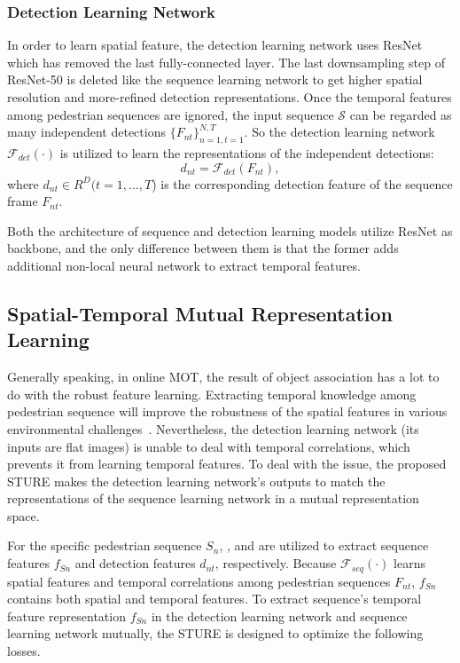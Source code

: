 \documentclass[times,twocolumn,final,authoryear]{elsarticle}
\begin{document}
\subsubsection{Detection Learning Network}
\label{sec:imagemodel}

In order to learn spatial feature, the detection learning network uses ResNet which has removed the last fully-connected layer.
The last downsampling step of ResNet-50 is deleted like the sequence learning network to get higher spatial resolution and more-refined detection representations.
Once the temporal features among pedestrian sequences are ignored, the input sequence $\mathcal{S}$ can be regarded as many independent detections $\{F_{nt}\}_{n=1,t=1}^{N,T}$.
So the detection learning network $\mathcal{F}_{det}(\cdot)$ is utilized to learn the representations of the independent detections: 
\begin{equation}\label{eq:detection_network}
d_{nt}=\mathcal{F}_{det}(F_{nt}),
\end{equation}
where $d_{nt}\in R^{D} (t=1,...,T$) is the corresponding detection feature of the sequence frame $F_{nt}$.

Both the architecture of sequence and detection learning models utilize ResNet as backbone,
and the only difference between them is that the former adds additional non-local neural network to extract temporal features.



\subsection{Spatial-Temporal Mutual {Representation} Learning}
\label{sec:stml}
Generally speaking, in online MOT, the result of object association has a lot to do with the robust feature learning.
Extracting temporal knowledge among pedestrian sequence {will improve} the robustness of the spatial features in various environmental challenges~\citep{RN986}.
Nevertheless, the detection learning network (its inputs are flat images) is unable to deal with temporal correlations, which {prevents} it from learning temporal features.
To deal with the issue, the proposed STURE makes the detection learning network's outputs to match the representations of the sequence learning network in a mutual representation space.

For the specific pedestrian sequence $S_n$, ,  and  are utilized to extract sequence features $f_{Sn}$ and detection features $d_{nt}${, respectively}.
Because $\mathcal{F}_{seq}(\cdot)$ learns spatial features and temporal correlations among pedestrian sequences $F_{nt}$, $f_{Sn}$ contains both spatial and temporal features.
To extract sequence's temporal feature representation $f_{Sn}$ in the detection learning network and sequence learning network mutually, the STURE is designed to optimize the following losses.
\end{document}
